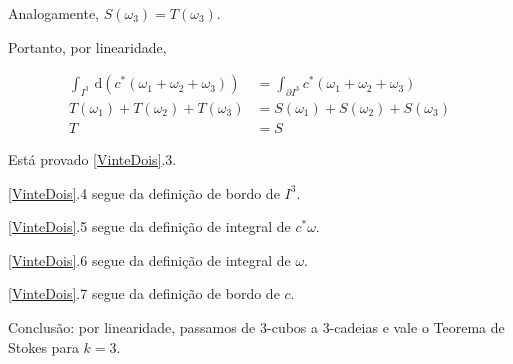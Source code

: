 \documentclass[12pt,a4paper]{article}
\begin{document}
		Analogamente, $S(\omega_3) = T(\omega_3)$.

		Portanto, por linearidade,

		\begin{align}
			\int_{I^3} \,\mathrm{d}(c^*(\omega_1 + \omega_2 + \omega_3)) &= \int_{\partial I^3} c^*(\omega_1 + \omega_2 + \omega_3) \\
			T(\omega_1) + T(\omega_2) + T(\omega_3) &= S(\omega_1) + S(\omega_2) + S(\omega_3) \\
			T &= S
		\end{align}

		Est\'a provado \ref{VinteDois}.3.

		\ref{VinteDois}.4 segue da defini\c{c}\~ao de bordo de $I^3$.

		\ref{VinteDois}.5 segue da defini\c{c}\~ao de integral de $c^*\omega$.

		\ref{VinteDois}.6 segue da defini\c{c}\~ao de integral de $\omega$.

		\ref{VinteDois}.7 segue da defini\c{c}\~ao de bordo de $c$.

		Conclus\~ao: por linearidade, passamos de $3$-cubos a $3$-cadeias e vale o Teorema de Stokes para $k = 3$.
\end{document}
